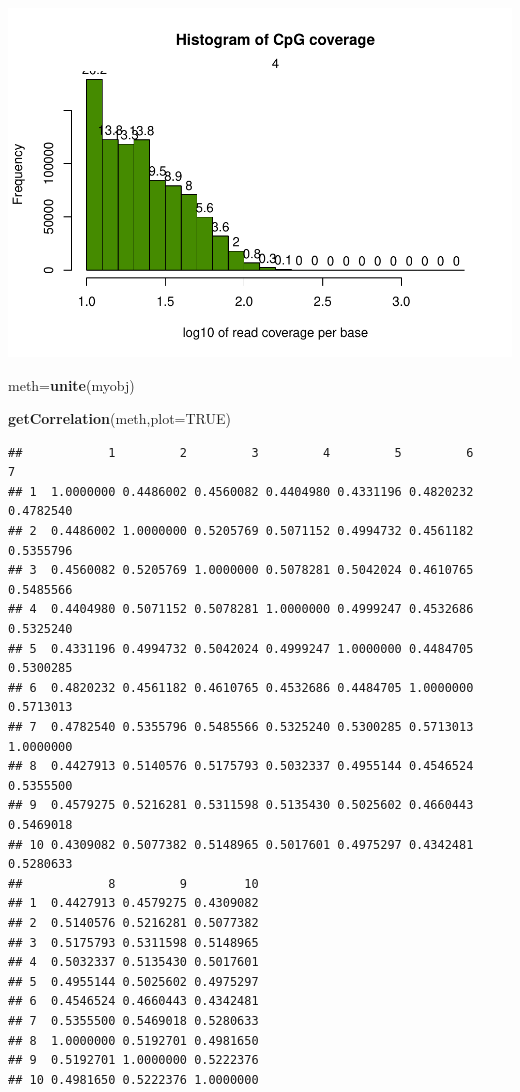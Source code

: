 \documentclass[]{article}
\newenvironment{Shaded}{\begin{snugshade}}{\end{snugshade}}
\newcommand{\KeywordTok}[1]{\textcolor[rgb]{0.13,0.29,0.53}{\textbf{#1}}}
\newcommand{\DataTypeTok}[1]{\textcolor[rgb]{0.13,0.29,0.53}{#1}}
\newcommand{\OtherTok}[1]{\textcolor[rgb]{0.56,0.35,0.01}{#1}}
\newcommand{\NormalTok}[1]{#1}
\begin{document}
\includegraphics{mk-02_files/figure-latex/unnamed-chunk-7-1.pdf}

\begin{Shaded}
\begin{Highlighting}[]
\NormalTok{meth=}\KeywordTok{unite}\NormalTok{(myobj)}
\end{Highlighting}
\end{Shaded}

\begin{Shaded}
\begin{Highlighting}[]
\KeywordTok{getCorrelation}\NormalTok{(meth,}\DataTypeTok{plot=}\OtherTok{TRUE}\NormalTok{)}
\end{Highlighting}
\end{Shaded}

\begin{verbatim}
##            1         2         3         4         5         6         7
## 1  1.0000000 0.4486002 0.4560082 0.4404980 0.4331196 0.4820232 0.4782540
## 2  0.4486002 1.0000000 0.5205769 0.5071152 0.4994732 0.4561182 0.5355796
## 3  0.4560082 0.5205769 1.0000000 0.5078281 0.5042024 0.4610765 0.5485566
## 4  0.4404980 0.5071152 0.5078281 1.0000000 0.4999247 0.4532686 0.5325240
## 5  0.4331196 0.4994732 0.5042024 0.4999247 1.0000000 0.4484705 0.5300285
## 6  0.4820232 0.4561182 0.4610765 0.4532686 0.4484705 1.0000000 0.5713013
## 7  0.4782540 0.5355796 0.5485566 0.5325240 0.5300285 0.5713013 1.0000000
## 8  0.4427913 0.5140576 0.5175793 0.5032337 0.4955144 0.4546524 0.5355500
## 9  0.4579275 0.5216281 0.5311598 0.5135430 0.5025602 0.4660443 0.5469018
## 10 0.4309082 0.5077382 0.5148965 0.5017601 0.4975297 0.4342481 0.5280633
##            8         9        10
## 1  0.4427913 0.4579275 0.4309082
## 2  0.5140576 0.5216281 0.5077382
## 3  0.5175793 0.5311598 0.5148965
## 4  0.5032337 0.5135430 0.5017601
## 5  0.4955144 0.5025602 0.4975297
## 6  0.4546524 0.4660443 0.4342481
## 7  0.5355500 0.5469018 0.5280633
## 8  1.0000000 0.5192701 0.4981650
## 9  0.5192701 1.0000000 0.5222376
## 10 0.4981650 0.5222376 1.0000000
\end{verbatim}
\end{document}
